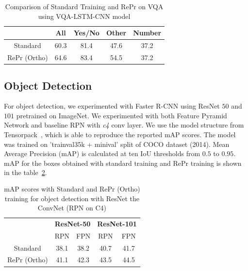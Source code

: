 \begin{table}[H]
\center
{}
\begin{tabular}{ccccc}
        \toprule
         & \textbf{All} & \textbf{Yes/No} & \textbf{Other} & \textbf{Number} \\ \midrule
Standard & 60.3    &    81.4    &  47.6     &  37.2      \\
RePr (Ortho)    & {\color[HTML]{3166FF} 64.6}    &  {\color[HTML]{3166FF} 83.4}      &  {\color[HTML]{3166FF} 54.5}     &  37.2     \\ \bottomrule
\end{tabular}
\caption{Comparison of Standard Training and RePr on VQA using VQA-LSTM-CNN model}
\label{tbl:vqa}
\end{table}

\subsection{Object Detection}

For object detection, we experimented with Faster R-CNN using ResNet $50$ and $101$ pretrained on ImageNet.
We experimented with both Feature Pyramid Network and baseline RPN with \textit{c4} conv layer.
We use the model structure from Tensorpack~\cite{wu2016tensorpack}, which is able to reproduce the reported mAP scores.
The model was trained on 'trainval35k + minival' split of COCO dataset (2014). 
Mean Average Precision (mAP) is calculated at ten IoU thresholds from $0.5$ to $0.95$. 
mAP for the boxes obtained with standard training and RePr training is shown in the table~\ref{tbl:rpn}.

\begin{table}[H]
\center
{}
\begin{tabular}{ccccc}
        \toprule
         & \multicolumn{2}{l}{\textbf{ResNet-50}} & \multicolumn{2}{l}{\textbf{ResNet-101}} \\
         & RPN           & FPN           & RPN           & FPN           \\ \midrule
Standard  &      38.1  & 38.2      &  40.7     & 41.7\\
RePr (Ortho) &   {\color[HTML]{3166FF} 41.1}  & {\color[HTML]{3166FF} 42.3}     &   {\color[HTML]{3166FF} 43.5}     & {\color[HTML]{3166FF} 44.5}       \\ \bottomrule
\end{tabular}
\caption{mAP scores with Standard and RePr (Ortho) training for object detection with ResNet the ConvNet (RPN on C4)}
\label{tbl:rpn}
\end{table}

